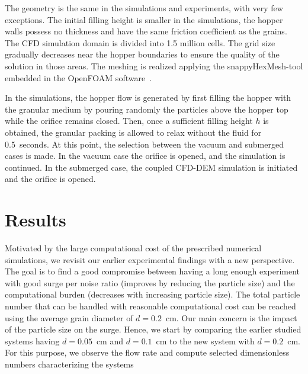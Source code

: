 \documentclass[twoside,twocolumn,9pt]{article}
\begin{document}
The geometry is the same in the simulations and experiments, with very few exceptions. The initial filling height is smaller in the simulations, 
the hopper walls possess no thickness and have the same friction coefficient as the grains. The CFD simulation domain is divided into 1.5 million cells. The grid size gradually decreases near the hopper boundaries to ensure the quality of the solution in those areas. The meshing is realized applying the snappyHexMesh-tool embedded in the OpenFOAM software~\cite{openfoamdoc}.
%


In the simulations, the hopper flow is generated by first filling the hopper with the granular medium by pouring 
randomly the particles above the hopper top while the orifice remains closed. Then, once a sufficient filling height $h$ is
obtained, the granular packing is allowed to relax without the fluid for 0.5~seconds. At this point, the selection between the 
vacuum and submerged cases is made. In the vacuum case the orifice is opened, and the simulation is continued.
In the submerged case, the coupled CFD-DEM simulation is initiated and the orifice is opened. 


\section{Results}

Motivated by the large computational cost of the prescribed numerical simulations, we revisit our earlier experimental findings with a new perspective.
The goal is to find a good compromise between having a long enough experiment with good surge per noise ratio (improves by reducing the particle size) and the computational burden (decreases with increasing particle size). The total particle number that can be handled with reasonable computational cost can be reached using the  average grain diameter of $d=0.2$~cm. 
Our main concern is the impact of the particle size on the surge. 
Hence, we start by comparing the earlier studied systems  having $d=0.05$~cm and $d=0.1$~cm \cite{koivistoSubmitted} to the new system with $d=0.2$~cm. For this purpose, we observe the flow rate and compute selected dimensionless numbers characterizing the systems
\end{document}
